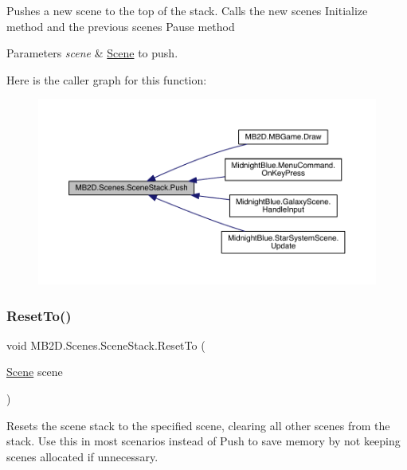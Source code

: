 Pushes a new scene to the top of the stack. Calls the new scenes Initialize method and the previous scenes Pause method 


\begin{DoxyParams}{Parameters}
{\em scene} & \hyperlink{class_m_b2_d_1_1_scenes_1_1_scene}{Scene} to push.\\
\hline
\end{DoxyParams}
Here is the caller graph for this function\+:
\nopagebreak
\begin{figure}[H]
\begin{center}
\leavevmode
\includegraphics[width=350pt]{class_m_b2_d_1_1_scenes_1_1_scene_stack_a22760622453ac16621534bc324ec039f_icgraph}
\end{center}
\end{figure}
\hypertarget{class_m_b2_d_1_1_scenes_1_1_scene_stack_a521a38426d3e85caeb53b2909b623562}{}\label{class_m_b2_d_1_1_scenes_1_1_scene_stack_a521a38426d3e85caeb53b2909b623562} 
\subsubsection{\texorpdfstring{Reset\+To()}{ResetTo()}}
{\footnotesize\ttfamily void M\+B2\+D.\+Scenes.\+Scene\+Stack.\+Reset\+To (\begin{DoxyParamCaption}\item[{\hyperlink{class_m_b2_d_1_1_scenes_1_1_scene}{Scene}}]{scene }\end{DoxyParamCaption})\hspace{0.3cm}{\ttfamily [inline]}}



Resets the scene stack to the specified scene, clearing all other scenes from the stack. Use this in most scenarios instead of Push to save memory by not keeping scenes allocated if unnecessary. 


